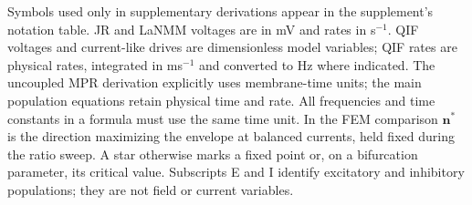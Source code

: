 \documentclass[11pt,a4paper]{article}
\newif\ifsupp
\newif\ifappendices
\begin{document}



\fi
\clearpage
\appendix
\makeatletter
\let\ne@stdsection\section
\renewcommand{\section}{\clearpage\ne@stdsection}
\makeatother
\ifsupp
\section*{Notation and units}\phantomsection\label{app:notation-supp}
\def\notationtablelabel{tab:notation-supp}
Table~\ref{\notationtablelabel} groups the symbols by their role in the calculation.
\ifappendices\else Symbols used only in supplementary derivations appear in the supplement's notation table.\fi
JR and LaNMM voltages are in mV and rates in s$^{-1}$. QIF voltages and current-like
drives are dimensionless model variables; QIF rates are physical rates, integrated
in ms$^{-1}$ and converted to Hz where indicated. The uncoupled MPR derivation explicitly uses membrane-time units; the main
population equations retain physical time and rate. All frequencies and time
constants in a formula must use the same time unit. In the FEM comparison $\mathbf n^*$ is the direction maximizing the envelope
at balanced currents, held fixed during the ratio sweep. A star otherwise marks a fixed point or,
on a bifurcation parameter, its critical value. Subscripts E and I identify
excitatory and inhibitory populations; they are not field or current variables.
\end{document}
